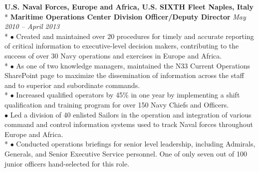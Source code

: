 \documentclass{article}
\begin{document}
\noindent \textbf{U.S. Naval Forces, Europe and Africa, U.S. SIXTH Fleet \hfill Naples, Italy} \\*
\textbf{Maritime Operations Center Division Officer/Deputy Director} \hfill \textit{May 2010 -- April 2013} \\*
\noindent $\bullet$ Created and maintained over 20 procedures for timely and accurate reporting of critical information to executive-level decision makers, contributing to the success of over 30 Navy operations and exercises in Europe and Africa. \\*
$\bullet$ As one of two knowledge managers, maintained the N33 Current Operations SharePoint page to maximize the dissemination of information across the staff and to superior and subordinate commands. \\*
$\bullet$ Increased qualified operators by 45\% in one year by implementing a shift qualification and training program for over 150 Navy Chiefs and Officers. \\
\noindent $\bullet$ Led a division of 40 enlisted Sailors in the operation and integration of various command and control information systems used to track Naval forces throughout Europe and Africa. \\*
$\bullet$ Conducted operations briefings for senior level leadership, including Admirals, Generals, and Senior Executive Service personnel. One of only seven out of 100 junior officers hand-selected for this role. \\
\end{document}
